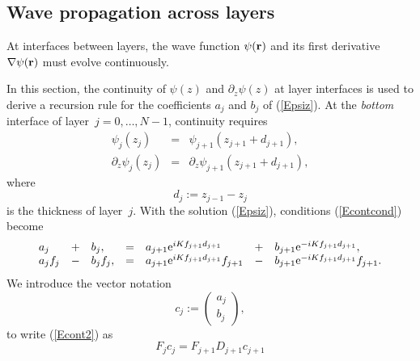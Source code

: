 \subsection{Wave propagation across layers}

%
%
%

At interfaces between layers,
the wave function $\psi(\mathbf{r})$ and its first derivative
$\mathbf{\nabla}\psi(\mathbf{r})$ must evolve continuously.


In this section,
the continuity of $\psi(z)$ and $\partial_z\psi(z)$ at layer interfaces
is used to derive a recursion rule
for the coefficients $a_j$ and $b_j$ of (\ref{Epsiz}).
At the \textit{bottom} interface of layer~$j=0,\ldots,N-1$,
continuity requires
\begin{equation}\label{Econtcond}
  \begin{array}{lcl}
            \psi_j(z_j)&=&\psi_{j+1}(z_{j+1}+d_{j+1}),\\
            \partial_z\psi_j(z_j)&=&\partial_z\psi_{j+1}(z_{j+1}+d_{j+1}),
  \end{array}
\end{equation}
  where
\begin{equation}
  d_j:=z_{j-1}-z_{j}
\end{equation}
is the thickness of layer~$j$.
With the solution (\ref{Epsiz}), conditions (\ref{Econtcond}) become
\begin{equation}\label{Econt2}
  \begin{array}{lclclcl}
  a_j &+& b_j,
  &=&
  a_{j+1}\text{e}^{iKf_{j+1}d_{j+1}} &+& b_{j+1}\text{e}^{-iKf_{j+1}d_{j+1}},
  \\
  a_j f_j  &-& b_j f_j,
  &=&
 a_{j+1}\text{e}^{iKf_{j+1}d_{j+1}} f_{j+1} &-& b_{j+1}\text{e}^{-iKf_{j+1}d_{j+1}} f_{j+1}.
  \end{array}
\end{equation}
We introduce the vector notation
\begin{equation}\label{Evecc}
  c_j := \left( \begin{array}{c}a_j\\b_j\end{array} \right),
\end{equation}
to write (\ref{Econt2}) as
\begin{equation}\label{EFcFDc}
  F_j c_j = F_{j+1} D_{j+1} c_{j+1}
\end{equation}
